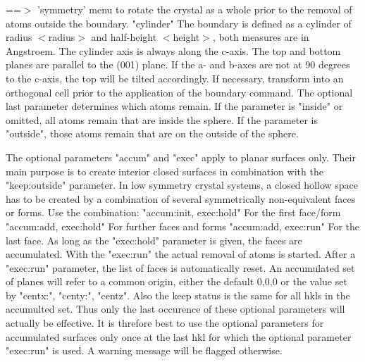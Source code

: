        ==$> $ 'symmetry' menu to rotate the crystal as a whole prior to 
       the removal of atoms outside the boundary. 
"cylinder"  The boundary is defined as a cylinder of radius $ <$radius$> $ 
       and half-height $ <$height$> $, both measures are in Angstroem. The 
       cylinder axis is always along the c-axis. The top and bottom 
       planes are parallel to the (001) plane. If the a- and b-axes are 
       not at 90 degrees to the c-axis, the top will be tilted 
       accordingly. If necessary, transform into an orthogonal cell 
       prior to the application of the boundary command. 
       The optional last parameter determines which atoms remain. 
       If the parameter is "inside" or omitted, all atoms remain that 
       are inside the sphere. 
       If the parameter is "outside", those atoms remain that are on 
       the outside of the sphere. 
\par
The optional parameters "accum" and "exec" apply to planar surfaces 
only. Their main purpose is to create interior closed surfaces 
in combination with the "keep:outside" parameter. 
In low symmetry crystal systems, a closed hollow space has to be 
created by a combination of several symmetrically non-equivalent 
faces or forms. Use the combination: 
"accum:init, exec:hold" For the first face/form 
"accum:add, exec:hold"  For further faces and forms 
"accum:add, exec:run"   For the last face. 
As long as the "exec:hold" parameter is given, the faces are 
accumulated. With the "exec:run" the actual removal of atoms 
is started. 
After a "exec:run" parameter, the list of faces is automatically 
reset. 
An accumulated set of planes will refer to a common origin, either 
the default 0,0,0 or the value set by "centx:", "centy:", "centz". 
Also the keep status is the same for all hkls in the accumulted set. 
Thus only the last occurence of these optional parameters will 
actually be effective. It is threfore best to use the optional 
parameters for accumulated surfaces only once at the last hkl for 
which the optional parameter "exec:run" is used. A warning message 
will be flagged otherwise. 
